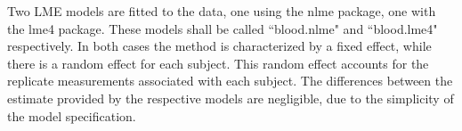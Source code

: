 
Two LME models are fitted to the data, one using the nlme package, one with the lme4 package. These models shall be called ``blood.nlme" and ``blood.lme4" respectively.
In both cases the method is characterized by a fixed effect, while there is a random effect for each subject.
This random effect accounts for the replicate measurements associated with each subject.
The differences between the estimate provided by the respective models are negligible, due to the simplicity of the model specification.
